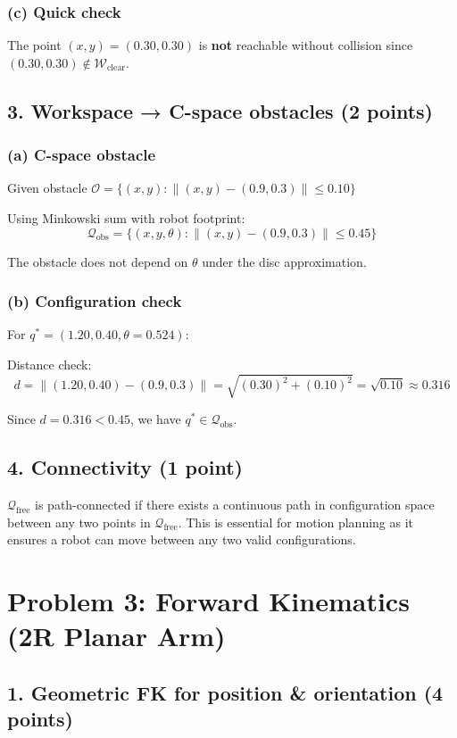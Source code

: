 \documentclass[11pt]{article}
\begin{document}
\subsubsection*{(c) Quick check}
The point $(x, y) = (0.30, 0.30)$ is \textbf{not} reachable without collision since $(0.30, 0.30) \notin \mathcal{W}_{\text{clear}}$.

\subsection*{3. Workspace → C-space obstacles (2 points)}
\subsubsection*{(a) C-space obstacle}
Given obstacle $\mathcal{O} = \{(x, y) : \|(x, y) - (0.9, 0.3)\| \leq 0.10\}$

Using Minkowski sum with robot footprint:
$$\mathcal{Q}_{\text{obs}} = \{(x, y, \theta) : \|(x, y) - (0.9, 0.3)\| \leq 0.45\}$$

The obstacle does not depend on $\theta$ under the disc approximation.

\subsubsection*{(b) Configuration check}
For $q^* = (1.20, 0.40, \theta = 0.524)$:

Distance check:
$$d = \|(1.20, 0.40) - (0.9, 0.3)\| = \sqrt{(0.30)^2 + (0.10)^2} = \sqrt{0.10} \approx 0.316$$

Since $d = 0.316 < 0.45$, we have $q^* \in \mathcal{Q}_{\text{obs}}$.

\subsection*{4. Connectivity (1 point)}
$\mathcal{Q}_{\text{free}}$ is path-connected if there exists a continuous path in configuration space between any two points in $\mathcal{Q}_{\text{free}}$. This is essential for motion planning as it ensures a robot can move between any two valid configurations.

\section*{Problem 3: Forward Kinematics (2R Planar Arm)}

\subsection*{1. Geometric FK for position \& orientation (4 points)}
\end{document}
